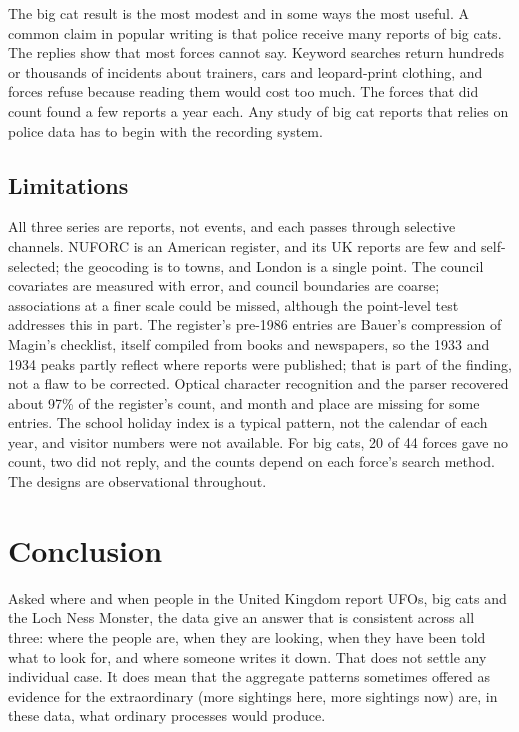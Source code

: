 \documentclass[11pt,a4paper]{article}
\begin{document}
The big cat result is the most modest and in some ways the most useful. A common claim in popular writing is that police receive many reports of big cats. The replies show that most forces cannot say. Keyword searches return hundreds or thousands of incidents about trainers, cars and leopard-print clothing, and forces refuse because reading them would cost too much. The forces that did count found a few reports a year each. Any study of big cat reports that relies on police data has to begin with the recording system.

\subsection{Limitations}
All three series are reports, not events, and each passes through selective channels. NUFORC is an American register, and its UK reports are few and self-selected; the geocoding is to towns, and London is a single point. The council covariates are measured with error, and council boundaries are coarse; associations at a finer scale could be missed, although the point-level test addresses this in part. The register's pre-1986 entries are Bauer's compression of Magin's checklist, itself compiled from books and newspapers, so the 1933 and 1934 peaks partly reflect where reports were published; that is part of the finding, not a flaw to be corrected. Optical character recognition and the parser recovered about 97\% of the register's count, and month and place are missing for some entries. The school holiday index is a typical pattern, not the calendar of each year, and visitor numbers were not available. For big cats, 20 of 44 forces gave no count, two did not reply, and the counts depend on each force's search method. The designs are observational throughout.

\section{Conclusion}\label{sec:concl}
Asked where and when people in the United Kingdom report UFOs, big cats and the Loch Ness Monster, the data give an answer that is consistent across all three: where the people are, when they are looking, when they have been told what to look for, and where someone writes it down. That does not settle any individual case. It does mean that the aggregate patterns sometimes offered as evidence for the extraordinary (more sightings here, more sightings now) are, in these data, what ordinary processes would produce.
\end{document}
